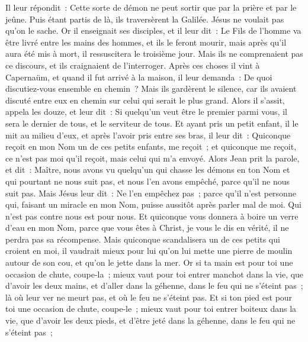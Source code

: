 \begin{multicols}{2}
Il leur répondit~: Cette sorte de démon ne peut sortir que par la prière et par le jeûne.
Puis étant partis de là, ils traversèrent la Galilée. Jésus ne voulait pas qu'on le sache.
Or il enseignait ses disciples, et il leur dit~: Le Fils de l'homme va être livré entre les mains des hommes, et ils le feront mourir, mais après qu'il aura été mis à mort, il ressuscitera le troisième jour.
Mais ils ne comprenaient pas ce discours, et ils craignaient de l'interroger.
Après ces choses il vint à Capernaüm, et quand il fut arrivé à la maison, il leur demanda~: De quoi discutiez-vous ensemble en chemin~?
Mais ils gardèrent le silence, car ils avaient discuté entre eux en chemin sur celui qui serait le plus grand.
Alors il s'assit, appela les douze, et leur dit~: Si quelqu'un veut être le premier parmi vous, il sera le dernier de tous, et le serviteur de tous.
Et ayant pris un petit enfant, il le mit au milieu d'eux, et après l'avoir pris entre ses bras, il leur dit~:
Quiconque reçoit en mon Nom un de ces petits enfants, me reçoit~; et quiconque me reçoit, ce n'est pas moi qu'il reçoit, mais celui qui m'a envoyé.
Alors Jean prit la parole, et dit~: Maître, nous avons vu quelqu'un qui chasse les démons en ton Nom et qui pourtant ne nous suit pas, et nous l'en avons empêché, parce qu'il ne nous suit pas.
Mais Jésus leur dit~: Ne l'en empêchez pas~; parce qu'il n'est personne qui, faisant un miracle en mon Nom, puisse aussitôt après parler mal de moi.
Qui n'est pas contre nous est pour nous.
Et quiconque vous donnera à boire un verre d'eau en mon Nom, parce que vous êtes à Christ, je vous le dis en vérité, il ne perdra pas sa récompense.
Mais quiconque scandalisera un de ces petits qui croient en moi, il vaudrait mieux pour lui qu'on lui mette une pierre de moulin autour de son cou, et qu'on le jette dans la mer.
Or si ta main est pour toi une occasion de chute, coupe-la~; mieux vaut pour toi entrer manchot dans la vie, que d'avoir les deux mains, et d'aller dans la géhenne, dans le feu qui ne s'éteint pas~;
là où leur ver ne meurt pas, et où le feu ne s'éteint pas.
Et si ton pied est pour toi une occasion de chute, coupe-le~; mieux vaut pour toi entrer boiteux dans la vie, que d'avoir les deux pieds, et d'être jeté dans la géhenne, dans le feu qui ne s'éteint pas~;

\end{multicols}
